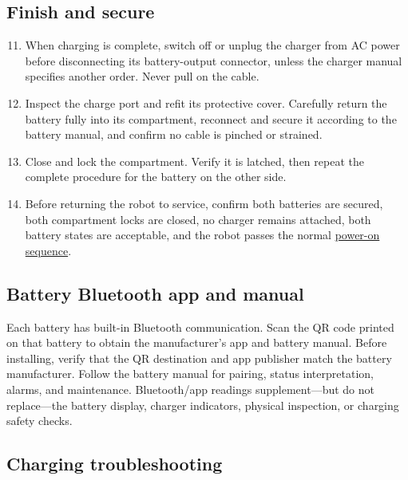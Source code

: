 \documentclass[
  10pt,
  letterpaper,
  openany]{report}
\providecommand{\tightlist}{%
  \setlength{\itemsep}{0pt}\setlength{\parskip}{0pt}}
\begin{document}
\subsection{Finish and secure}\label{finish-and-secure}

\begin{enumerate}
\setcounter{enumi}{10}
\tightlist
\item
  When charging is complete, switch off or unplug the charger from AC
  power before disconnecting its battery-output connector, unless the
  charger manual specifies another order. Never pull on the cable.
\item
  Inspect the charge port and refit its protective cover. Carefully
  return the battery fully into its compartment, reconnect and secure it
  according to the battery manual, and confirm no cable is pinched or
  strained.
\item
  Close and lock the compartment. Verify it is latched, then repeat the
  complete procedure for the battery on the other side.
\item
  Before returning the robot to service, confirm both batteries are
  secured, both compartment locks are closed, no charger remains
  attached, both battery states are acceptable, and the robot passes the
  normal \hyperref[robot-startup]{power-on sequence}.
\end{enumerate}

\subsection{Battery Bluetooth app and
manual}\label{battery-bluetooth-app-and-manual}

Each battery has built-in Bluetooth communication. Scan the QR code
printed on that battery to obtain the manufacturer's app and battery
manual. Before installing, verify that the QR destination and app
publisher match the battery manufacturer. Follow the battery manual for
pairing, status interpretation, alarms, and maintenance. Bluetooth/app
readings supplement---but do not replace---the battery display, charger
indicators, physical inspection, or charging safety checks.

\subsection{Charging troubleshooting}\label{charging-troubleshooting}
\end{document}
